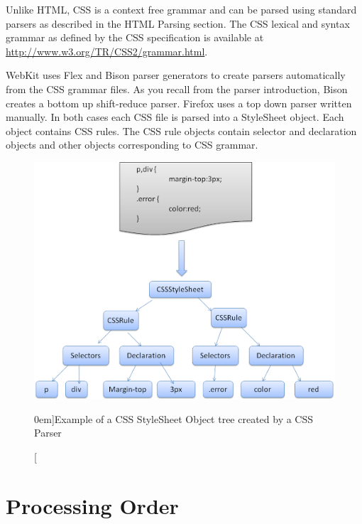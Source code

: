 \documentclass[a4paper, justified, notoc]{tufte-handout} %
\begin{document}
Unlike HTML, CSS is a context free grammar and can be parsed using standard parsers as described in the HTML Parsing section. The CSS lexical and syntax grammar as defined by the CSS specification is available at \url{http://www.w3.org/TR/CSS2/grammar.html}.

WebKit uses Flex and Bison parser generators to create parsers automatically from the CSS grammar files. As you recall from the parser introduction, Bison creates a bottom up shift-reduce parser. Firefox uses a top down parser written manually. In both cases each CSS file is parsed into a StyleSheet object. Each object contains CSS rules. The CSS rule objects contain selector and declaration objects and other objects corresponding to CSS grammar.

\begin{figure}%
	\centering
  \includegraphics[width=1.0\textwidth]{./figures/css_parse_tree.png}
  \caption[][0em]{Example of a CSS StyleSheet Object tree created by a CSS Parser}
  \label{fig:css_parse_tree}
\end{figure}


\section{Processing Order} %
\label{sec:processing_order}
\end{document}
